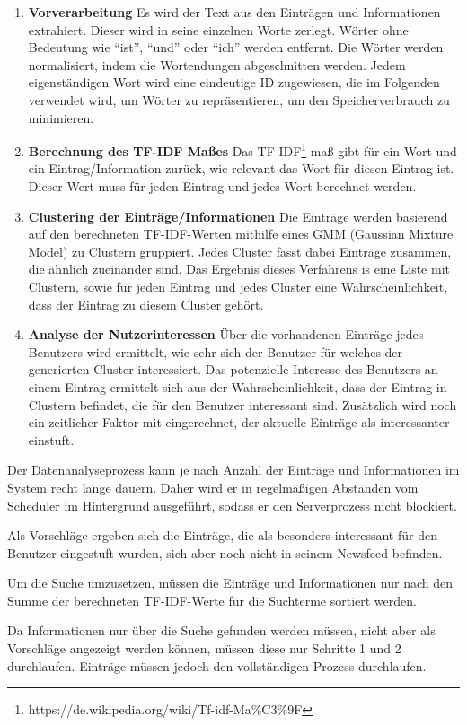 		\begin{enumerate}
			\item \textbf{Vorverarbeitung} Es wird der Text aus den Einträgen und Informationen extrahiert. Dieser wird in seine einzelnen Worte zerlegt. Wörter ohne Bedeutung wie \enquote{ist}, \enquote{und} oder \enquote{ich} werden entfernt. Die Wörter werden normalisiert, indem die Wortendungen abgeschnitten werden. Jedem eigenständigen Wort wird eine eindeutige ID zugewiesen, die im Folgenden verwendet wird, um Wörter zu repräsentieren, um den Speicherverbrauch zu minimieren.

			\item \textbf{Berechnung des TF-IDF Maßes} Das TF-IDF\footnote{https://de.wikipedia.org/wiki/Tf-idf-Ma\%C3\%9F} maß gibt für ein Wort und ein Eintrag/Information zurück, wie relevant das Wort für diesen Eintrag ist. Dieser Wert muss für jeden Eintrag und jedes Wort berechnet werden.

			\item \textbf{Clustering der Einträge/Informationen} Die Einträge werden basierend auf den berechneten TF-IDF-Werten mithilfe eines GMM (Gaussian Mixture Model) zu Clustern gruppiert. Jedes Cluster fasst dabei Einträge zusammen, die ähnlich zueinander sind. Das Ergebnis dieses Verfahrens is eine Liste mit Clustern, sowie für jeden Eintrag und jedes Cluster eine Wahrscheinlichkeit, dass der Eintrag zu diesem Cluster gehört.

			\item \textbf{Analyse der Nutzerinteressen} Über die vorhandenen Einträge jedes Benutzers wird ermittelt, wie sehr sich der Benutzer für welches der generierten Cluster interessiert. Das potenzielle Interesse des Benutzers an einem Eintrag ermittelt sich aus der Wahrscheinlichkeit, dass der Eintrag in Clustern befindet, die für den Benutzer interessant sind. Zusätzlich wird noch ein zeitlicher Faktor mit eingerechnet, der aktuelle Einträge als interessanter einstuft.
		\end{enumerate}

		Der Datenanalyseprozess kann je nach Anzahl der Einträge und Informationen im System recht lange dauern. Daher wird er in regelmäßigen Abständen vom Scheduler im Hintergrund ausgeführt, sodass er den Serverprozess nicht blockiert.

		Als Vorschläge ergeben sich die Einträge, die als besonders interessant für den Benutzer eingestuft wurden, sich aber noch nicht in seinem Newsfeed befinden.

		Um die Suche umzusetzen, müssen die Einträge und Informationen nur nach den Summe der berechneten TF-IDF-Werte für die Suchterme sortiert werden.

		Da Informationen nur über die Suche gefunden werden müssen, nicht aber als Vorschläge angezeigt werden können, müssen diese nur Schritte 1 und 2 durchlaufen. Einträge müssen jedoch den vollständigen Prozess durchlaufen.

